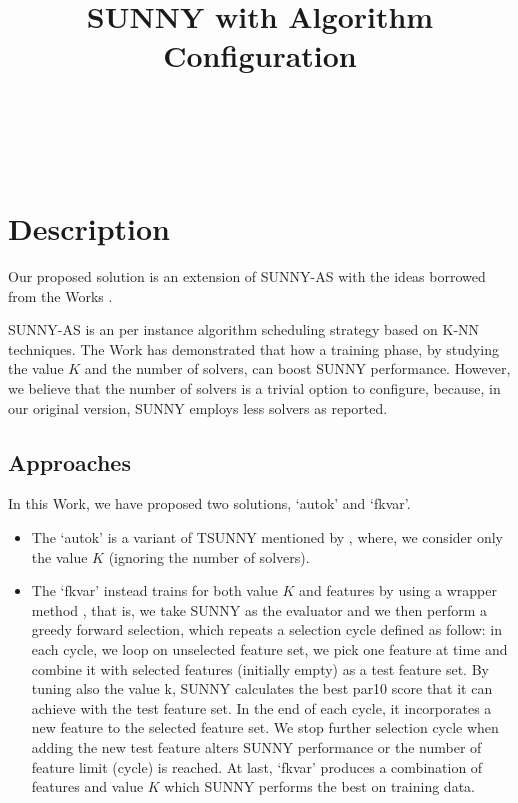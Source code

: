 \documentclass[tablecaption=bottom,wcp]{jmlr} %
\title[SUNNY-OASC]{SUNNY with Algorithm Configuration}
\author{\Name{Tong Liu} \Email{t.liu@unibo.it}\\
   \Name{Roberto Amadini} \Email{roberto.amadini@unimelb.edu.au}\\
   \Name{Jacopo Mauro} \Email{mauro.jacopo@gmail.com}\\
    }
\begin{document}
\maketitle



\section{Description}


Our proposed solution is an extension of SUNNY-AS \cite{DBLP:conf/ictai/2015,sunnyas} with the ideas borrowed from the Works \cite{DBLP:conf/lion/LindauerBH16,Kohavi97wrappersfor}.

SUNNY-AS is an per instance algorithm scheduling strategy based on K-NN techniques. The Work \cite{DBLP:conf/lion/LindauerBH16} has demonstrated that how a training phase, by studying the value $K$ and the number of solvers, can boost SUNNY performance. However, we believe that the number of solvers is a trivial option to configure, because, in our original version, SUNNY employs less solvers as reported. 

\subsection{Approaches}

In this Work, we have proposed two solutions, `autok' and `fkvar'. 

\begin{itemize}
  \item The `autok' is a variant of TSUNNY mentioned by \cite{DBLP:conf/lion/LindauerBH16}, where, we consider only the value $K$ (ignoring the number of solvers). 
  \item The `fkvar' instead trains for both value $K$ and features by using a wrapper method \cite{Kohavi97wrappersfor}, that is, we take SUNNY as the evaluator and we then perform a greedy forward selection, which repeats a selection cycle defined as follow: in each cycle, we loop on unselected feature set, we pick one feature at time and combine it with selected features (initially empty) as a test feature set. By tuning also the value k, SUNNY calculates the best par10 score that it can achieve with the test feature set. In the end of each cycle, it incorporates a new feature to the selected feature set. We stop further selection cycle when adding the new test feature alters SUNNY performance or the number of feature limit (cycle) is reached. At last, `fkvar' produces a combination of features and value $K$ which SUNNY performs the best on training data.
\end{itemize}
 
\end{document}
